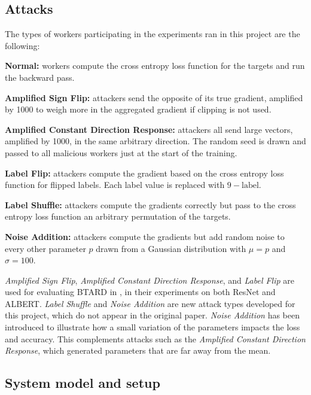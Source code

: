 \documentclass{article}
\begin{document}
\subsection{Attacks}
The types of workers participating in the experiments ran in this project are the following:
\begin{description}
\item \textbf{Normal:} workers compute the cross entropy loss function for the targets and run the backward pass.
\item \textbf{Amplified Sign Flip:} attackers send the opposite of its true gradient, amplified by 1000 to weigh more in the aggregated gradient if clipping is not used. 
\item \textbf{Amplified Constant Direction Response:} attackers all send large vectors, amplified by 1000, in the same arbitrary direction. The random seed is drawn and passed to all malicious workers just at the start of the training.
\item \textbf{Label Flip:} attackers compute the gradient based on the cross entropy loss function for flipped labels. Each label value is replaced with $9 - \text{label}$.
\item \textbf{Label Shuffle:} attackers compute the gradients correctly but pass to the cross entropy loss function an arbitrary permutation of the targets.
\item \textbf{Noise Addition:} attackers compute the gradients but add random noise to every other parameter $p$ drawn from a Gaussian distribution with $\mu = p$ and $\sigma = 100$.
\end{description}

\textit{Amplified Sign Flip}, \textit{Amplified Constant Direction Response}, and \textit{Label Flip} are used for evaluating BTARD in \cite{gorbunov2021secure}, in their experiments on both ResNet and ALBERT. 
\textit{Label Shuffle} and \textit{Noise Addition} are new attack types developed for this project, which do not appear in the original paper. \textit{Noise Addition} has been introduced to illustrate how a small variation of the parameters impacts the loss and accuracy. This complements attacks such as the \textit{Amplified Constant Direction Response}, which generated parameters that are far away from the mean.

\subsection{System model and setup}
\end{document}
